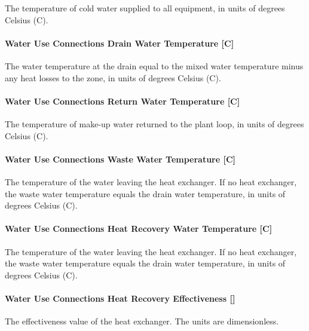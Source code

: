 The temperature of cold water supplied to all equipment, in units of degrees Celsius (C).

\paragraph{Water Use Connections Drain Water Temperature {[}C{]}}\label{water-use-connections-drain-water-temperature-c}

The water temperature at the drain equal to the mixed water temperature minus any heat losses to the zone, in units of degrees Celsius (C).

\paragraph{Water Use Connections Return Water Temperature {[}C{]}}\label{water-use-connections-return-water-temperature-c}

The temperature of make-up water returned to the plant loop, in units of degrees Celsius (C).

\paragraph{Water Use Connections Waste Water Temperature {[}C{]}}\label{water-use-connections-waste-water-temperature-c}

The temperature of the water leaving the heat exchanger. If no heat exchanger, the waste water temperature equals the drain water temperature, in units of degrees Celsius (C).

\paragraph{Water Use Connections Heat Recovery Water Temperature {[}C{]}}\label{water-use-connections-heat-recovery-water-temperature-c}

The temperature of the water leaving the heat exchanger. If no heat exchanger, the waste water temperature equals the drain water temperature, in units of degrees Celsius (C).

\paragraph{Water Use Connections Heat Recovery Effectiveness {[]}}\label{water-use-connections-heat-recovery-effectiveness}

The effectiveness value of the heat exchanger. The units are dimensionless.

